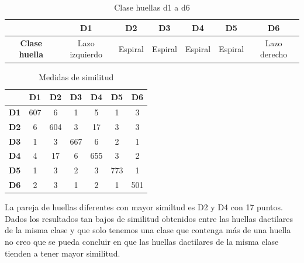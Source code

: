 \documentclass[10pt,a4paper]{article}
\begin{document}
\pagebreak
\subsection{}

\begin{table}[htbp]
\centering
\begin{tabular}{|c|c|c|c|c|c|c|}
\hline
 & \textbf{D1} & \textbf{D2}  & \textbf{D3}  & \textbf{D4}  & \textbf{D5}  & \textbf{D6} \\ \hline
  \textbf{Clase huella} & Lazo izquierdo & Espiral & Espiral & Espiral & Espiral & Lazo derecho \\ \hline

\end{tabular}

  \caption{Clase huellas d1 a d6}
  \label{tabla:clases}
\end{table}

\begin{table}[h!]
\centering
\begin{tabular}{|c|c|c|c|c|c|c|}
\hline
 & \textbf{D1} & \textbf{D2}  & \textbf{D3}  & \textbf{D4}  & \textbf{D5}  & \textbf{D6} \\ \hline
   \textbf{D1} & \cellcolor{gray!25}607 & 6 & 1 & 5 & 1 & 3 \\ \hline
   \textbf{D2} & 6 & \cellcolor{gray!25}604 & 3 & 17 & 3 & 3 \\ \hline
   \textbf{D3} & 1 & 3 & \cellcolor{gray!25}667 & 6 & 2 & 1\\ \hline
   \textbf{D4} & 4 & 17 & 6 & \cellcolor{gray!25}655 & 3 & 2 \\ \hline
   \textbf{D5} & 1 & 3 & 2 & 3 & \cellcolor{gray!25}773 & 1 \\ \hline
   \textbf{D6} & 2 & 3 & 1 & 2 & 1 & \cellcolor{gray!25}501 \\ \hline

\end{tabular}

  \caption{Medidas de similitud}
  \label{tabla:medidas}
\end{table}

La pareja de huellas diferentes con mayor similtud es D2 y D4 con 17 puntos.\\
Dados los resultados tan bajos de similitud obtenidos entre las huellas dactilares de la misma clase y que solo tenemos una clase que contenga más de una huella no creo que se pueda concluir en que las huellas dactilares de la misma clase tienden a tener mayor similitud.
\section{}
\end{document}
